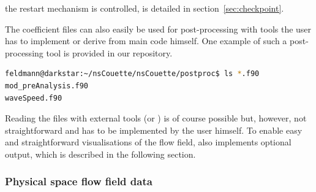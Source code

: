 \documentclass[a4paper, 11pt, DIV=11]{scrartcl}
\begin{document}
the restart mechanism is controlled, is detailed in section~\ref{sec:checkpoint}.
\par
The coefficient files can also easily be used for post-processing with tools
the user has to implement or derive from main code himself. One example of such
a post-processing tool is provided in our repository.
\begin{lstlisting}[language=bash]
feldmann@darkstar:~/nsCouette/nsCouette/postproc$ ls *.f90
mod_preAnalysis.f90
waveSpeed.f90
\end{lstlisting}
Reading the  files with external tools (\eg \python or \plplot) is
of course possible but, however, not straightforward and has to be implemented
by the user himself. To enable easy and straightforward visualisations of the
flow field, \nsc also implements optional \hdf output, which is described in the
following section.

\subsubsection{Physical space flow field data}
\label{sec:iohdf5}
\end{document}

